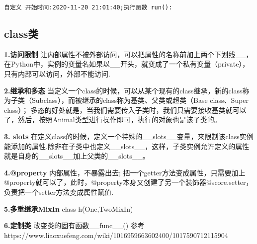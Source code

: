 \documentclass[11pt]{article}
\begin{document}
    \begin{Verbatim}[commandchars=\\\{\}]
自定义 开始时间:2020-11-20 21:01:40;执行函数 run():
    \end{Verbatim}

    \hypertarget{classux7c7b}{%
\subsection{class类}\label{classux7c7b}}

\textbf{1.访问限制}
让内部属性不被外部访问，可以把属性的名称前加上两个下划线\_\_，在Python中，实例的变量名如果以\_\_开头，就变成了一个私有变量（private），只有内部可以访问，外部不能访问.

\textbf{2.继承和多态}
当定义一个class的时候，可以从某个现有的class继承，新的class称为子类（Subclass），而被继承的class称为基类、父类或超类（Base
class、Super class）；
多态的好处就是，当我们需要传入子类时，我们只需要接收基类就可以了，然后，按照Animal类型进行操作即可，执行的对象也是该子类的。

\textbf{3. \textbf{slots}}
在定义class的时候，定义一个特殊的\_\_slots\_\_变量，来限制该class实例能添加的属性.除非在子类中也定义\_\_slots\_\_，这样，子类实例允许定义的属性就是自身的\_\_slots\_\_加上父类的\_\_slots\_\_。

\textbf{4.@property} 内部属性，不暴露出去;
把一个getter方法变成属性，只需要加上@property就可以了，此时，@property本身又创建了另一个装饰器@score.setter，负责把一个setter方法变成属性赋值.

\textbf{5.多重继承MixIn} class h(One,TwoMixIn)

\textbf{6.定制类} 改变类的固有函数\_\_func\_\_()
参考https://www.liaoxuefeng.com/wiki/1016959663602400/1017590712115904
\end{document}
